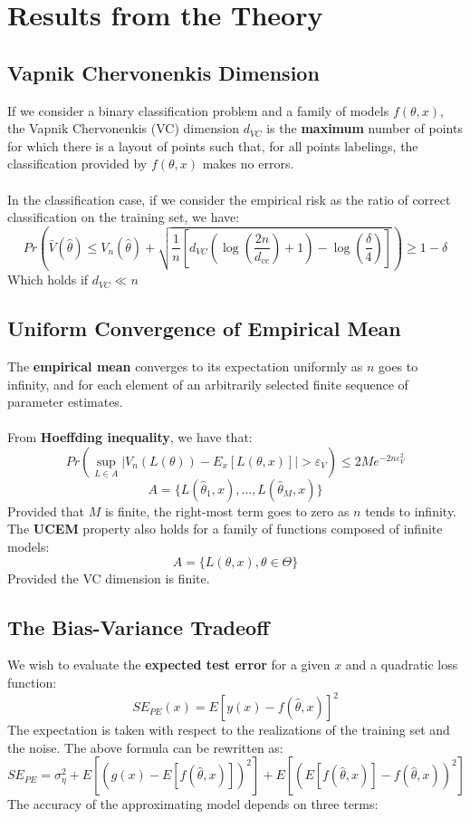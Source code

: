 \documentclass{article}
\begin{document}
\section{Results from the Theory}
\subsection{Vapnik Chervonenkis Dimension}
If we consider a binary classification problem and a family of models $f(\theta, x)$, the Vapnik Chervonenkis (VC) dimension $d_{VC}$ is the \textbf{maximum} number of points for which there is a layout of points such that, for all points labelings, the classification provided by $f(\theta, x)$ makes no errors. \\ \\
In the classification case, if we consider the empirical risk as the ratio of correct classification on the training set, we have:
\[ Pr \left( \displaystyle \bar{V}(\hat \theta) \leq V_n(\hat \theta) + \sqrt{\frac{1}{n} \left[ d_{VC} \left( \log \left( \frac{2n}{d_{vc}} \right) + 1 \right) - \log \left( \frac{\delta}{4} \right) \right]} \right) \geq 1 - \delta \]
Which holds if $d_{VC} \ll n$

\subsection{Uniform Convergence of Empirical Mean}
The \textbf{empirical mean} converges to its expectation uniformly as $n$ goes to infinity, and for each element of an arbitrarily selected finite sequence of parameter estimates. \\ \\
From \textbf{Hoeffding inequality}, we have that:
\[ Pr \left( \sup_{L \in A} |V_n(L(\theta)) - E_x[L(\theta, x)]| > \varepsilon_V \right) \leq 2Me^{-2n\varepsilon^2_V} \]
\[ A = \{ L(\hat \theta_1, x), \dots, L(\hat\theta_M, x) \} \]
Provided that $M$ is finite, the right-most term goes to zero as $n$ tends to infinity. The \textbf{UCEM} property also holds for a family of functions composed of infinite models:
\[ A = \{ L(\theta, x), \theta \in \Theta \} \]
Provided the VC dimension is finite.

\subsection{The Bias-Variance Tradeoff}
We wish to evaluate the \textbf{expected test error} for a given $x$ and a quadratic loss function:
\[ SE_{PE}(x) = E[ y(x) - f(\hat\theta, x) ]^2 \]
The expectation is taken with respect to the realizations of the training set and the noise. The above formula can be rewritten as:
\[ SE_{PE} = \sigma^2_\eta + E \left[ (g(x) - E [f(\hat \theta, x)])^2 \right] + E \left[ (E[f(\hat \theta, x)] - f(\hat \theta, x))^2 \right] \]
The accuracy of the approximating model depends on three terms:
\end{document}
